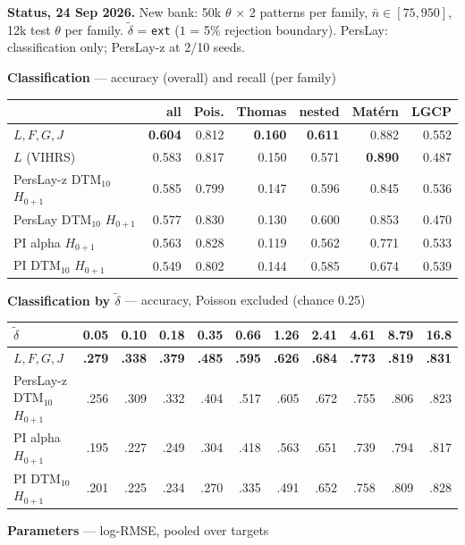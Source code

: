 \documentclass[10pt]{article}
\newcommand{\dt}{\tilde\delta}
\begin{document}
\textbf{Status, 24 Sep 2026.} New bank: 50k $\theta$ $\times$ 2 patterns per family, $\bar n\in[75,950]$, 12k test $\theta$ per family. $\dt$ = \texttt{ext} ($1$ = 5\% rejection boundary). PersLay: classification only; PersLay-z at 2/10 seeds.

\bigskip
\textbf{Classification} --- accuracy (overall) and recall (per family)

\smallskip
\begin{tabular}{@{}lrrrrrr@{}}
\toprule
 & all & Pois. & Thomas & nested & Mat\'ern & LGCP \\
\midrule
$L,F,G,J$                      & \textbf{0.604} & 0.812 & \textbf{0.160} & \textbf{0.611} & 0.882 & 0.552 \\
$L$ (VIHRS)                    & 0.583 & 0.817 & 0.150 & 0.571 & \textbf{0.890} & 0.487 \\
PersLay-z DTM$_{10}$ $H_{0+1}$ & 0.585 & 0.799 & 0.147 & 0.596 & 0.845 & 0.536 \\
PersLay DTM$_{10}$ $H_{0+1}$   & 0.577 & 0.830 & 0.130 & 0.600 & 0.853 & 0.470 \\
PI alpha $H_{0+1}$             & 0.563 & 0.828 & 0.119 & 0.562 & 0.771 & 0.533 \\
PI DTM$_{10}$ $H_{0+1}$        & 0.549 & 0.802 & 0.144 & 0.585 & 0.674 & 0.539 \\
\bottomrule
\end{tabular}

\bigskip
\textbf{Classification by $\dt$} --- accuracy, Poisson excluded (chance 0.25)

\smallskip
\begin{tabular}{@{}lrrrrrrrrrr@{}}
\toprule
$\dt$ & 0.05 & 0.10 & 0.18 & 0.35 & 0.66 & 1.26 & 2.41 & 4.61 & 8.79 & 16.8 \\
\midrule
$L,F,G,J$                      & \textbf{.279} & \textbf{.338} & \textbf{.379} & \textbf{.485} & \textbf{.595} & \textbf{.626} & \textbf{.684} & \textbf{.773} & \textbf{.819} & \textbf{.831} \\
PersLay-z DTM$_{10}$ $H_{0+1}$ & .256 & .309 & .332 & .404 & .517 & .605 & .672 & .755 & .806 & .823 \\
PI alpha $H_{0+1}$             & .195 & .227 & .249 & .304 & .418 & .563 & .651 & .739 & .794 & .817 \\
PI DTM$_{10}$ $H_{0+1}$        & .201 & .225 & .234 & .270 & .335 & .491 & .652 & .758 & .809 & .828 \\
\bottomrule
\end{tabular}

\bigskip
\textbf{Parameters} --- log-RMSE, pooled over targets
\end{document}
